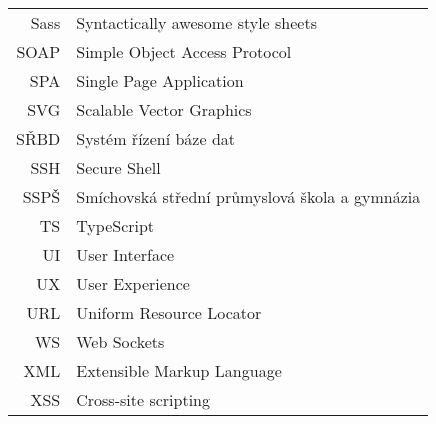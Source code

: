 \begin{longtable}{rl}
Sass & Syntactically awesome style sheets\\
SOAP & Simple Object Access Protocol\\
SPA & Single Page Application\\
SVG & Scalable Vector Graphics\\
SŘBD & Systém řízení báze dat\\
SSH & Secure Shell\\
SSPŠ & Smíchovská střední průmyslová škola a gymnázia\\
TS & TypeScript\\
UI & User Interface\\
UX & User Experience\\
URL & Uniform Resource Locator\\
WS & Web Sockets\\
XML & Extensible Markup Language\\
XSS & Cross-site scripting
\end{longtable}